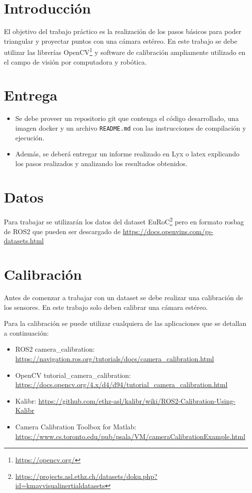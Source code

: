 \documentclass[tp]{lcc}
\begin{document}
\maketitle

\section{Introducción}

El objetivo del trabajo práctico es la realización de los pasos básicos para poder triangular y proyectar puntos con una cámara estéreo. En este trabajo se debe utilizar  las librerías OpenCV\footnote{\url{https://opencv.org/}} y software de calibración ampliamente utilizado en el campo de visión por computadora y robótica.


\section{Entrega}
\begin{itemize}
	\item Se debe proveer un repositorio git que contenga el código desarrollado, una imagen docker y un archivo \lstinline{README.md} con las instrucciones de compilación y ejecución.
	\item Además, se deberá entregar un informe realizado en Lyx o latex explicando los pasos realizados y analizando los resultados obtenidos.
\end{itemize}

\section{Datos}
Para trabajar se utilizarán los datos del dataset EuRoC\footnote{\url{https://projects.asl.ethz.ch/datasets/doku.php?id=kmavvisualinertialdatasets}} pero en formato rosbag de ROS2 que pueden ser descargado de \url{https://docs.openvins.com/gs-datasets.html}

\section{Calibración}
Antes de comenzar a trabajar con un dataset se debe realizar una calibración de los sensores. En este trabajo solo deben calibrar una cámara estéreo.

Para la calibración se puede utilizar cualquiera de las aplicaciones que se detallan a continuación:
\begin{itemize}
	\item ROS2 camera\_calibration:  \url{https://navigation.ros.org/tutorials/docs/camera_calibration.html}
	\item OpenCV tutorial\_camera\_calibration:\\ \url{https://docs.opencv.org/4.x/d4/d94/tutorial_camera_calibration.html}
	\item Kalibr: \url{https://github.com/ethz-asl/kalibr/wiki/ROS2-Calibration-Using-Kalibr}
	\item Camera Calibration Toolbox for Matlab:\\ \url{https://www.cs.toronto.edu/pub/psala/VM/cameraCalibrationExample.html}
\end{itemize}
\end{document}
